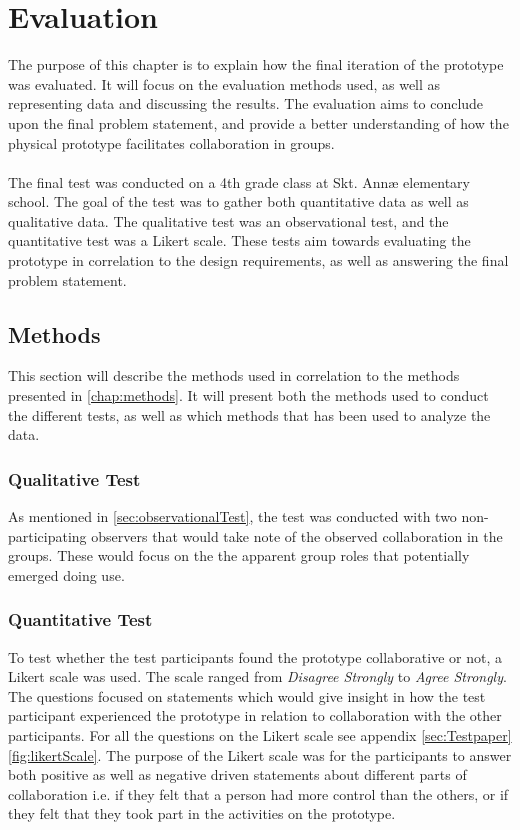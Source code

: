 \chapter{Evaluation}

The purpose of this chapter is to explain how the final iteration of the prototype was evaluated. It will focus on the evaluation methods used, as well as representing data and discussing the results. The evaluation aims to conclude upon the final problem statement, and provide a better understanding of how the physical prototype facilitates collaboration in groups.\\\\

The final test was conducted on a 4th grade class at Skt. Annæ elementary school. The goal of the test was to gather both quantitative data as well as qualitative data. The qualitative test was an observational test, and the quantitative test was a Likert scale. These tests aim towards evaluating the prototype in correlation to the design requirements, as well as answering the final problem statement.

\section{Methods}
This section will describe the methods used in correlation to the methods presented in \autoref{chap:methods}. It will present both the methods used to conduct the different tests, as well as which methods that has been used to analyze the data.

\subsection{Qualitative Test}
As mentioned in \autoref{sec:observationalTest}, the test was conducted with two non-participating observers that would take note of the observed collaboration in the groups. These would focus on the the apparent group roles that potentially emerged doing use. 


\subsection{Quantitative Test}
To test whether the test participants found the prototype collaborative or not, a Likert scale was used. The scale ranged from \textit{Disagree Strongly} to \textit{Agree Strongly}. The questions focused on statements which would give insight in how the test participant experienced the prototype in relation to collaboration with the other participants. For all the questions on the Likert scale see appendix \ref{sec:Testpaper} \ref{fig:likertScale}. The purpose of the Likert scale was for the participants to answer both positive as well as negative driven statements about different parts of collaboration i.e. if they felt that a person had more control than the others, or if they felt that they took part in the activities on the prototype.\\\\

